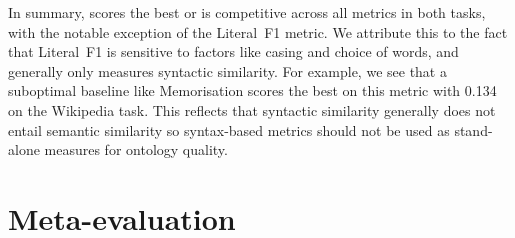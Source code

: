 In summary, \name scores the best or is competitive across all metrics in both tasks, with the notable exception of the Literal~F1 metric. We attribute this to the fact that Literal~F1 is sensitive to factors like casing and choice of words, and generally only measures syntactic similarity. For example, we see that a suboptimal baseline like Memorisation scores the best on this metric with 0.134 on the Wikipedia task. This reflects that syntactic similarity generally does not entail semantic similarity so syntax-based metrics should not be used as stand-alone measures for ontology quality.


\section{Meta-evaluation}



